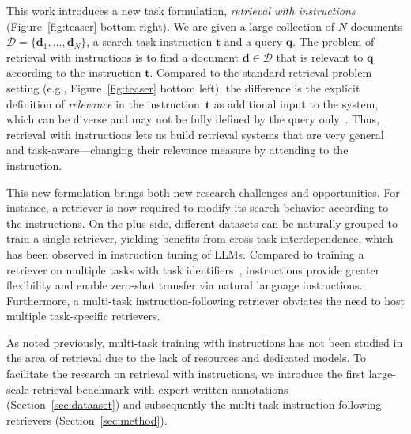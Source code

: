 \label{sec:task_formulation}
{This work introduces a new task formulation, \emph{retrieval with instructions} (Figure~\ref{fig:teaser} bottom right).
}
{We are given} a large collection of $N$ documents $\mathcal{D} = \{\boldsymbol{d}_1, \ldots, \boldsymbol{d}_N\}$, a search task instruction $\boldsymbol{t}$ and a query $\boldsymbol{q}$. 
The problem of retrieval with instructions is to find a document $\boldsymbol{d} \in \mathcal{D}$ that is relevant to $\boldsymbol{q}$ according to the instruction $\boldsymbol{t}$.
Compared to the standard retrieval problem setting (e.g., Figure~\ref{fig:teaser} bottom left), the difference is the explicit definition of \emph{relevance} in the instruction~$\boldsymbol{t}$ as additional input to the system, which can be diverse and may not be fully defined by the query only~\cite{ruthven_lalmas_2003}. 
Thus, retrieval with instructions lets us build retrieval systems that are very general and task-aware---changing their relevance measure by attending to the instruction.

{
This new formulation brings both new research challenges and opportunities. For instance, a retriever is now required to modify its search behavior according to the instructions. 
On the plus side, different datasets can be naturally grouped to train a single retriever, yielding benefits from cross-task interdependence, which has been observed in instruction tuning of LLMs.
Compared to training a retriever on multiple tasks with task identifiers~\cite{maillard-etal-2021-multi}, instructions provide greater flexibility and enable zero-shot transfer via natural language instructions.
Furthermore, a multi-task instruction-following retriever obviates the need to host multiple task-specific retrievers.
}

{
As noted previously, multi-task training with instructions has not been studied in the area of retrieval due to the lack of resources and dedicated models. To facilitate the research on retrieval with instructions, we  introduce the first large-scale retrieval benchmark with expert-written annotations (Section~\ref{sec:dataaset}) and subsequently the multi-task instruction-following retrievers (Section~\ref{sec:method})}. 


